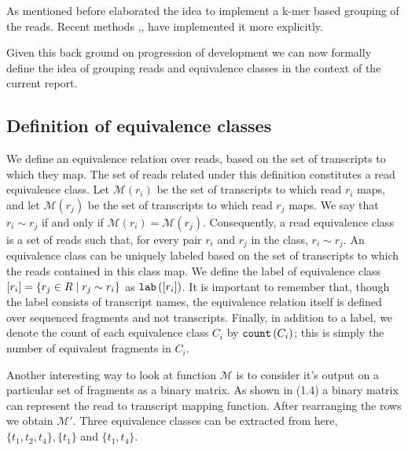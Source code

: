  As mentioned before \citep{sailfish} elaborated the idea to implement a k-mer based grouping of the reads. Recent methods \citep{kallisto},\citep{salmon},\citep{rapmap} have implemented it more explicitly. 

Given this back ground on progression of development we can now formally define the idea of grouping reads and equivalence classes in the context of the current report.  

\subsection{Definition of equivalence classes}
\label{subsec:gen_equiv_classes}
We define an equivalence relation over reads, based on the set of transcripts to which they map.  The set of reads related under this definition constitutes a read equivalence class. Let $\mathcal{M}\left(r_i\right)$ be the set of transcripts to which read $r_i$ maps, and let $\mathcal{M}\left(r_j\right)$ be the set of transcripts to which read $r_j$ maps.  We say that $r_i \sim r_j$ if and only if $\mathcal{M}\left(r_i\right) = \mathcal{M}\left(r_j\right)$. Consequently, a read equivalence class is a set of reads such that, for every pair $r_i$ and $r_j$ in the class, $r_i \sim r_j$. An equivalence class can be uniquely labeled based on the set of transcripts to which the reads contained in this class map.  We define the label of equivalence class $\left[r_i\right] = \{ r_j \in R \mid r_j \sim r_i\}$ as $\text{\texttt{lab}}\left(\left[r_i\right]\right)$.  It is important to remember that, though the label consists of transcript names, the equivalence relation itself is defined over sequenced fragments and not transcripts. Finally, in addition to a label, we denote the count of each equivalence class $C_i$ by $\text{\texttt{count}}\left(C_i\right)$; this is simply the number of equivalent fragments in $C_i$.


Another interesting way to look at function $\mathcal{M}$ is to consider it's output on a particular set of fragments as a binary matrix. As shown in (1.4) a binary matrix can represent the read to transcript mapping function. After rearranging the rows we obtain $\mathcal{M'}$. Three equivalence classes can be extracted from here, $\{t_1,t_2,t_4\}, \{t_1\}$ and $\{t_1,t_4\}$. 

